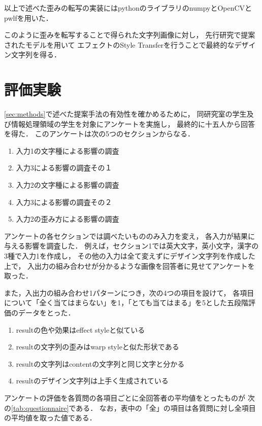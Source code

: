 \documentclass[autodetect-engine,dvi=dvipdfmx,ja=standard,a4j,jbase=10.5pt,twoside,twocolumn,magstyle=nomag*]{bxjsarticle}
\begin{document}
以上で述べた歪みの転写の実装にはpythonのライブラリのnumpyとOpenCVとpwlfを用いた．

このように歪みを転写することで得られた文字列画像に対し，
先行研究\cite{typography2019}で提案されたモデルを用いて
エフェクトのStyle Transferを行うことで最終的なデザイン文字列を得る．

\section{評価実験}\label{sec:experiment}
\cref{sec:methods}で述べた提案手法の有効性を確かめるために，
同研究室の学生及び情報処理領域の学生を対象にアンケートを実施し，
最終的に十五人から回答を得た．
このアンケートは次の5つのセクションからなる．

\begin{enumerate}
    \item 入力1の文字種による影響の調査
    \item 入力3による影響の調査その１
    \item 入力2の文字種による影響の調査
    \item 入力3による影響の調査その２
    \item 入力2の歪み方による影響の調査
\end{enumerate}

アンケートの各セクションでは調べたいもののみ入力を変え，
各入力が結果に与える影響を調査した．
例えば，セクション1では英大文字，英小文字，漢字の3種で入力1を作成し，
その他の入力は全て変えずにデザイン文字列を作成した上で，
入出力の組み合わせが分かるような画像を回答者に見せてアンケートを取った．

また，入出力の組み合わせ1パターンにつき，次の4つの項目を設けて，
各項目について「全く当てはまらない」を1，「とても当てはまる」を5とした五段階評価のデータをとった．
\begin{enumerate}[label=\textbf{項目\arabic*:}]
    \item resultの色や効果はeffect styleと似ている
    \item resultの文字列の歪みはwarp styleと似た形状である
    \item resultの文字列はcontentの文字列と同じ文字と分かる
    \item resultのデザイン文字列は上手く生成されている
\end{enumerate}

アンケートの評価を各質問の各項目ごとに全回答者の平均値をとったものが
次の\cref{tab:questionnaire}である．
なお，表中の「全」の項目は各質問に対し全項目の平均値を取った値である．
\end{document}
